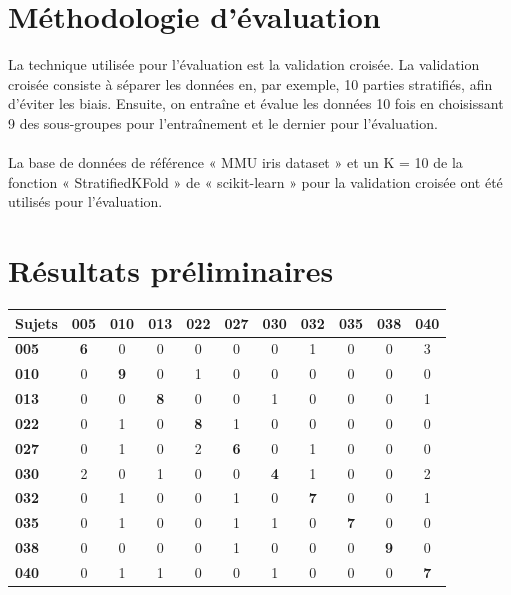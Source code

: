 \documentclass[12pt,twoside,letterpaper]{article}
\begin{document}
\section{Méthodologie d’évaluation}
La technique utilisée pour l'évaluation est la validation croisée. La validation croisée consiste à séparer les données en, par exemple, 10 parties stratifiés, afin d’éviter les biais. Ensuite, on entraîne et évalue les données 10 fois en choisissant 9 des sous-groupes pour l'entraînement et le dernier pour l'évaluation.\cite{ref_03}
\ \\~\\
La base de données de référence « MMU iris dataset » et un K = 10 de la fonction « StratifiedKFold » de « scikit-learn » pour la validation croisée ont été utilisés pour l'évaluation.

\section{Résultats préliminaires}
		\begin{center}
			\vspace{0.3em}
			{ \fontsize{12}{12}\selectfont  	
				\begin{tabular}{l|c|c|c|c|c|c|c|c|c|c}
				Sujets & \textbf{005} & \textbf{010} & \textbf{013} & \textbf{022} & \textbf{027} & \textbf{030} & \textbf{032} & 						\textbf{035} & \textbf{038} & \textbf{040} \\ \hline
				\textbf{005} & \textbf{6} & 0 & 0 & 0 & 0 & 0 & 1 & 0 & 0 & 3 \\ \hline
				\textbf{010} & 0 & \textbf{9} & 0 & 1 & 0 & 0 & 0 & 0 & 0 & 0 \\ \hline
				\textbf{013} & 0 & 0 & \textbf{8} & 0 & 0 & 1 & 0 & 0 & 0 & 1 \\ \hline
				\textbf{022} & 0 & 1 & 0 & \textbf{8} & 1 & 0 & 0 & 0 & 0 & 0 \\ \hline
				\textbf{027} & 0 & 1 & 0 & 2 & \textbf{6} & 0 & 1 & 0 & 0 & 0 \\ \hline
				\textbf{030} & 2 & 0 & 1 & 0 & 0 & \textbf{4} & 1 & 0 & 0 & 2 \\ \hline
				\textbf{032} & 0 & 1 & 0 & 0 & 1 & 0 & \textbf{7} & 0 & 0 & 1 \\ \hline
				\textbf{035} & 0 & 1 & 0 & 0 & 1 & 1 & 0 & \textbf{7} & 0 & 0 \\ \hline
				\textbf{038} & 0 & 0 & 0 & 0 & 1 & 0 & 0 & 0 & \textbf{9} & 0 \\ \hline
				\textbf{040} & 0 & 1 & 1 & 0 & 0 & 1 & 0 & 0 & 0 & \textbf{7} \\ \hline
				\end{tabular}
			}
		\end{center}
		
\end{document}

